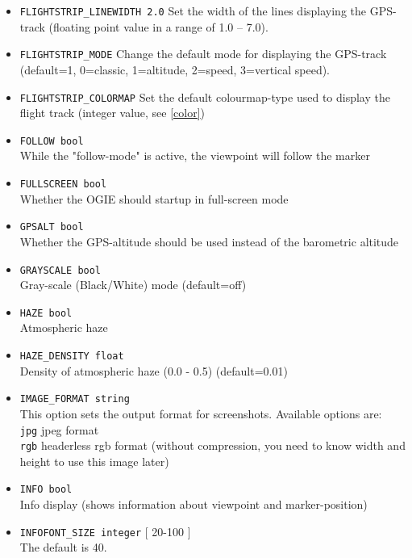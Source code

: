 \begin{itemize}
\item \texttt{FLIGHTSTRIP\_LINEWIDTH 2.0}
Set the width of the lines displaying the GPS-track (floating point value in a range of 1.0 -- 7.0).

\item \texttt{FLIGHTSTRIP\_MODE}
Change the default mode for displaying the GPS-track (default=1, 0=classic, 1=altitude, 2=speed, 3=vertical speed).

\item \texttt{FLIGHTSTRIP\_COLORMAP}
Set the default colourmap-type used to display the flight track (integer value, see \ref{color})


\item \texttt{FOLLOW bool} \\
While the "follow-mode" is active, the viewpoint will follow the marker

\item \texttt{FULLSCREEN bool} \\
Whether the OGIE should startup in full-screen mode

\item \texttt{GPSALT bool} \\
Whether the GPS-altitude should be used instead of the barometric altitude

\item \texttt{GRAYSCALE bool} \\
Gray-scale (Black/White) mode (default=off)

\item \texttt{HAZE bool} \\
Atmospheric haze

\item \texttt{HAZE\_DENSITY float} \\
Density of atmospheric haze (0.0 - 0.5) (default=0.01)

\item \texttt{IMAGE\_FORMAT string} \\
This option sets the output format for screenshots. Available options are: \\
\texttt{jpg} jpeg format \\
\texttt{rgb} headerless rgb format (without compression, you need to know width and height to use this image later)

\item \texttt{INFO bool} \\
Info display (shows information about viewpoint and marker-position)

\item \texttt{INFOFONT\_SIZE integer} [ 20-100 ] \\
The default is 40.


\end{itemize}
